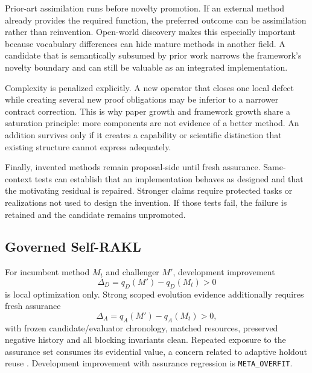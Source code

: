 Prior-art assimilation runs before novelty promotion. If an external method already provides the required function, the preferred outcome can be assimilation rather than reinvention. Open-world discovery makes this especially important because vocabulary differences can hide mature methods in another field. A candidate that is semantically subsumed by prior work narrows the framework's novelty boundary and can still be valuable as an integrated implementation.

Complexity is penalized explicitly. A new operator that closes one local defect while creating several new proof obligations may be inferior to a narrower contract correction. This is why paper growth and framework growth share a saturation principle: more components are not evidence of a better method. An addition survives only if it creates a capability or scientific distinction that existing structure cannot express adequately.

Finally, invented methods remain proposal-side until fresh assurance. Same-context tests can establish that an implementation behaves as designed and that the motivating residual is repaired. Stronger claims require protected tasks or realizations not used to design the invention. If those tests fail, the failure is retained and the candidate remains unpromoted.

\subsection{Governed Self-RAKL}
For incumbent method $M_t$ and challenger $M'$, development improvement
\begin{equation}\Delta_D=q_D(M')-q_D(M_t)>0\end{equation}
is local optimization only. Strong scoped evolution evidence additionally requires fresh assurance
\begin{equation}\Delta_A=q_A(M')-q_A(M_t)>0,\end{equation}
with frozen candidate/evaluator chronology, matched resources, preserved negative history and all blocking invariants clean. Repeated exposure to the assurance set consumes its evidential value, a concern related to adaptive holdout reuse \cite{dwork2015}. Development improvement with assurance regression is \texttt{META\_OVERFIT}.

